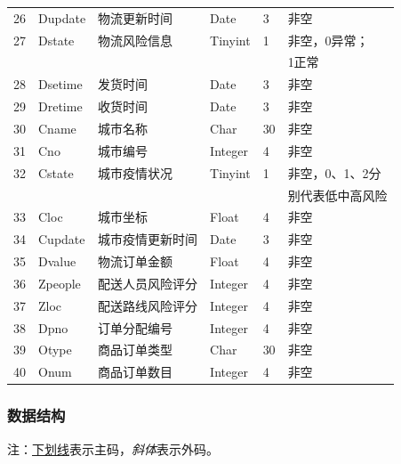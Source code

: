 \documentclass[12pt]{article}
\begin{document}
\begin{center}
\begin{supertabular}{llllll}
	26 &	Dupdate &	物流更新时间 &	Date &	3 &	非空 \\
	27 &	Dstate &	物流风险信息 &	Tinyint &	1 &	非空，0异常； \\ &&&&& 1正常\\
	28 & Dsetime & 发货时间 & Date & 3 & 非空 \\
	29 & Dretime & 收货时间 & Date & 3 & 非空 \\
	30 &	Cname &	城市名称 &	Char &	30 	& 非空 \\
	31 &	Cno &	城市编号 &	Integer &	4 &	非空 \\
	32 &	Cstate &	城市疫情状况 &	Tinyint &	1 &	 非空，0、1、2分\\ &&&&& 别代表低中高风险 \\
	33 &	Cloc &	城市坐标 &	Float &	4 &	非空 \\
	34 &	Cupdate &	城市疫情更新时间 &	Date &	3 &	非空 \\
	35 &	Dvalue 	& 物流订单金额 	& Float &	4 &	非空 \\
	36 &	Zpeople & 配送人员风险评分 & Integer & 4 & 非空 \\
	37 &	Zloc & 配送路线风险评分 & Integer & 4 & 非空 \\
	38 &	Dpno & 订单分配编号 & Integer & 4 & 非空 \\
	39 &	Otype & 商品订单类型 & Char &	30 	& 非空 \\
	40 &	Onum & 商品订单数目 & Integer &	4 &	非空 \\
\end{supertabular}
\end{center}

\subsubsection{数据结构}

注：\underline{下划线}表示主码，\textit{斜体}表示外码。
\vspace{0.2cm}
\tabletail{\bottomrule}
\end{document}
